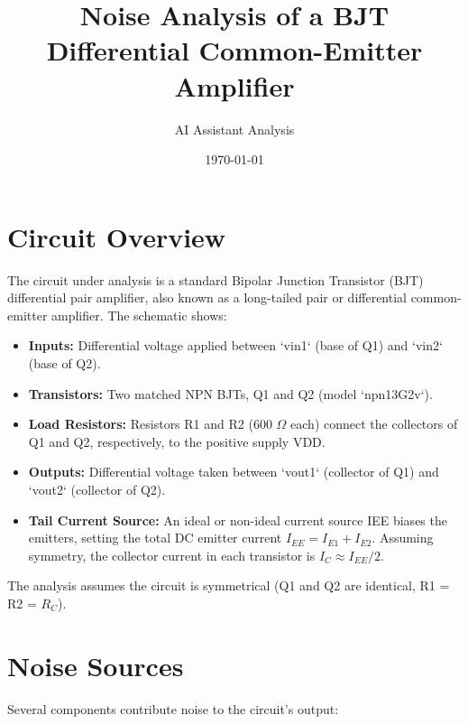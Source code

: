 \documentclass[11pt]{article}
\title{Noise Analysis of a BJT Differential Common-Emitter Amplifier}
\author{AI Assistant Analysis}
\date{\today} %
\begin{document}
\maketitle

\section{Circuit Overview}

The circuit under analysis is a standard Bipolar Junction Transistor (BJT) differential pair amplifier, also known as a long-tailed pair or differential common-emitter amplifier. The schematic shows:
\begin{itemize}
    \item \textbf{Inputs:} Differential voltage applied between `vin1` (base of Q1) and `vin2` (base of Q2).
    \item \textbf{Transistors:} Two matched NPN BJTs, Q1 and Q2 (model `npn13G2v`).
    \item \textbf{Load Resistors:} Resistors R1 and R2 (600 $\Omega$ each) connect the collectors of Q1 and Q2, respectively, to the positive supply VDD.
    \item \textbf{Outputs:} Differential voltage taken between `vout1` (collector of Q1) and `vout2` (collector of Q2).
    \item \textbf{Tail Current Source:} An ideal or non-ideal current source IEE biases the emitters, setting the total DC emitter current $I_{EE} = I_{E1} + I_{E2}$. Assuming symmetry, the collector current in each transistor is $I_C \approx I_{EE}/2$.
\end{itemize}
The analysis assumes the circuit is symmetrical (Q1 and Q2 are identical, R1 = R2 = $R_C$).

\section{Noise Sources}

Several components contribute noise to the circuit's output:
\end{document}
